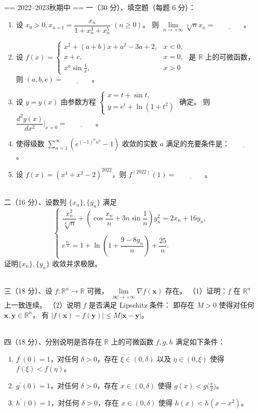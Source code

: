 == 2022--2023秋期中 ==
一（30 分）、填空题（每题 6 分）：
\begin{enumerate}[label=(\arabic*)]
\item 设 $x_{0}>0, x_{n+1}=\dfrac{x_{n}}{1+x_{n}^{3}+x_{n}^{5}}$ $(n \geq 0)$。
则 $\lim\limits_{n \rightarrow+\infty} \sqrt[3]{n} x_{n}=\underline{\qquad\qquad}$。
\item 设 $f(x)=\begin{cases}x^{2}+(a+b)x+a^{2}-3a+2, & x<0, \\
x+c, & x=0, \\ x^{a}\sin\frac{1}{x}, & x>0\end{cases}$ 
是 $\mathbb{R}$ 上的可微函数，则 $(a, b, c)=\underline{\qquad\qquad}$。
\item 设 $y=y(x)$ 由参数方程 $\begin{cases}x=t+\sin t, \\ y=e^{t}+\ln (1+t^{2})\end{cases}$ 确定。
则 $\dfrac{d^{2} y(x)}{d x^{2}}\bigg|_{x=0}=\underline{\qquad\qquad}$。
\item 使得级数 $\displaystyle\sum_{n=1}^{\infty}\left(e^{(-1)^{n}n^{a}}-1\right)$ 
收敛的实数 $a$ 满足的充要条件是：$\underline{\qquad\qquad}$。
\item 设 $f(x)=(x^{4}+x^{2}-2)^{2022}$，则 $f^{(2022)}(1)=\underline{\qquad\qquad}$。
\end{enumerate}
~\\
二（16 分）、设数列 $\{x_{n}\},\{y_{n}\}$ 满足
$$\begin{cases}
\dfrac{x_{n}^{2}}{\sqrt[n]{n}}+\left(\cos\dfrac{x_{n}}{n}+3n\sin\dfrac{1}{n}\right) y_{n}^{2}=2x_{n}+16y_{n}, \\ \\
e^{\frac{x_{n}}{n}}=1+\ln \left(1+\dfrac{9-8y_{n}}{n}\right)+\dfrac{25}{n}.
\end{cases}$$
证明$\{x_{n}\},\{y_{n}\}$ 收敛并求极限。

~\\
三（18 分）、设 $f: \mathbb{R}^{n} \rightarrow \mathbb{R}$ 可微，
$\lim\limits_{|\mathbf{x}| \rightarrow+\infty} \nabla f(\mathbf{x})$ 存在。
（1）证明：$f$ 在 $\mathbb{R}^{n}$ 上一致连续。
（2）说明 $f$ 是否满足 Lipschitz 条件：
即存在 $M>0$ 使得对任何 $\mathbf{x}, \mathbf{y} \in \mathbb{R}^{n}$，
有 $|f(\mathbf{x})-f(\mathbf{y})| \leq M|\mathbf{x}-\mathbf{y}|$。

~\\
四（18 分）、分别说明是否存在 $\mathbb{R}$ 上的可微函数 $f, g, h$ 满足如下条件：
\begin{enumerate}[label=(\arabic*)]
\item $f^{\prime}(0)=1$，对任何 $\delta>0$，存在 $\xi \in(0, \delta)$ 以及 $\eta \in(0, \xi)$ 使得 $f(\xi)<f(\eta)$。
\item $g^{\prime}(0)=1$，对任何 $\delta>0$，存在 $x \in(0, \delta)$ 使得 $g(x)<g\big(\frac{x}{2}\big)$。
\item $h^{\prime}(0)=1$，对任何 $\delta>0$，存在 $x \in(0, \delta)$ 使得 $h(x)<h(x-x^{2})$。
\end{enumerate}

